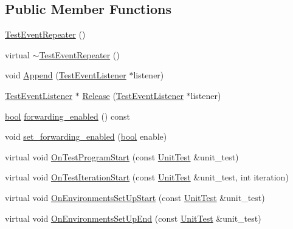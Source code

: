 \subsection*{Public Member Functions}
\begin{DoxyCompactItemize}
\item 
\hyperlink{classtesting_1_1internal_1_1TestEventRepeater_a97dc3b08bd62c615f16e4c73ed0b3894}{Test\+Event\+Repeater} ()
\item 
virtual \hyperlink{classtesting_1_1internal_1_1TestEventRepeater_a0f7129002fc4a33e29ce76a3b6df8d1b}{$\sim$\+Test\+Event\+Repeater} ()
\item 
void \hyperlink{classtesting_1_1internal_1_1TestEventRepeater_ad154ce021881721a5c46994316b14cb1}{Append} (\hyperlink{classtesting_1_1TestEventListener}{Test\+Event\+Listener} $\ast$listener)
\item 
\hyperlink{classtesting_1_1TestEventListener}{Test\+Event\+Listener} $\ast$ \hyperlink{classtesting_1_1internal_1_1TestEventRepeater_ac77a3d127e4726e11694e4ee9cf3b793}{Release} (\hyperlink{classtesting_1_1TestEventListener}{Test\+Event\+Listener} $\ast$listener)
\item 
\hyperlink{classbool}{bool} \hyperlink{classtesting_1_1internal_1_1TestEventRepeater_abaf2bfc453fc0e1005fcfb0f95deac4c}{forwarding\+\_\+enabled} () const
\item 
void \hyperlink{classtesting_1_1internal_1_1TestEventRepeater_a86c52e311b70598a385a0589277e92e0}{set\+\_\+forwarding\+\_\+enabled} (\hyperlink{classbool}{bool} enable)
\item 
virtual void \hyperlink{classtesting_1_1internal_1_1TestEventRepeater_a15ee2ff051063088d3a89a266d5ffcc4}{On\+Test\+Program\+Start} (const \hyperlink{classtesting_1_1UnitTest}{Unit\+Test} \&unit\+\_\+test)
\item 
virtual void \hyperlink{classtesting_1_1internal_1_1TestEventRepeater_a4062b3f070bb6531ab8494c13d3635d3}{On\+Test\+Iteration\+Start} (const \hyperlink{classtesting_1_1UnitTest}{Unit\+Test} \&unit\+\_\+test, int iteration)
\item 
virtual void \hyperlink{classtesting_1_1internal_1_1TestEventRepeater_ae71819925adec0471fa7abc5072b8244}{On\+Environments\+Set\+Up\+Start} (const \hyperlink{classtesting_1_1UnitTest}{Unit\+Test} \&unit\+\_\+test)
\item 
virtual void \hyperlink{classtesting_1_1internal_1_1TestEventRepeater_a3a92696df942dc92f985e52fddd6d303}{On\+Environments\+Set\+Up\+End} (const \hyperlink{classtesting_1_1UnitTest}{Unit\+Test} \&unit\+\_\+test)

\end{DoxyCompactItemize}
